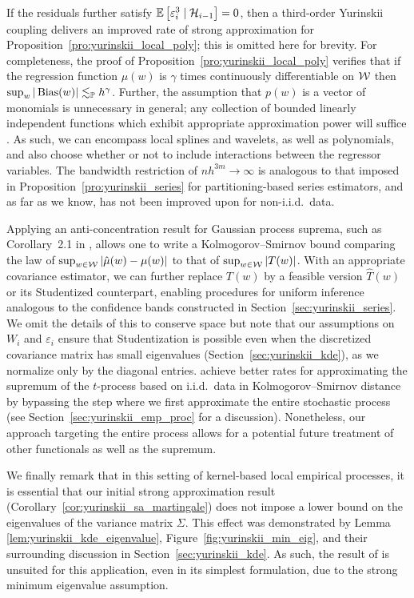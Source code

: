If the residuals further satisfy
$\mathbb{E} \left[ \varepsilon_i^3 \mid \mathcal{H}_{i-1} \right] = 0$, then
a third-order Yurinskii coupling delivers an improved rate of strong
approximation for Proposition~\ref{pro:yurinskii_local_poly}; this is omitted
here for
brevity. For completeness, the proof of
Proposition~\ref{pro:yurinskii_local_poly}
verifies that if the regression function $\mu(w)$ is $\gamma$ times
continuously differentiable on $\mathcal{W}$ then
$\sup_w |\operatorname{Bias}(w)| \lesssim_{\mathbb{P}} h^\gamma$. Further, the assumption that $p(w)$
is a vector of monomials is unnecessary in general; any collection of bounded
linearly independent functions which exhibit appropriate approximation power
will suffice \citep{eggermont2009maximum}. As such, we can encompass local
splines and wavelets, as well as polynomials, and also choose whether or not to
include interactions between the regressor variables. The bandwidth restriction
of $n h^{3m} \to \infty$ is analogous to that imposed in
Proposition~\ref{pro:yurinskii_series} for partitioning-based series
estimators, and as
far as we know, has not been improved upon for non-i.i.d.\ data.

Applying an anti-concentration result for Gaussian process suprema, such as
Corollary~2.1 in \citet{chernozhukov2014anti}, allows one to write a
Kolmogorov--Smirnov bound comparing the law of
$\sup_{w \in \mathcal{W}}|\hat\mu(w) - \mu(w)|$ to that of $\sup_{w \in \mathcal{W}}|T(w)|$.
With an appropriate covariance estimator, we can further replace $T(w)$ by a
feasible version $\hat T(w)$ or its Studentized counterpart, enabling
procedures for uniform inference analogous to the confidence bands constructed
in Section~\ref{sec:yurinskii_series}. We omit the details of this to conserve
space but
note that our assumptions on $W_i$ and $\varepsilon_i$ ensure that
Studentization is possible even when the discretized covariance matrix has
small eigenvalues (Section~\ref{sec:yurinskii_kde}), as we normalize only by
the diagonal
entries. \citet[Remark~3.1]{chernozhukov2014gaussian} achieve better rates for
approximating the supremum of the $t$-process based on i.i.d.\ data in
Kolmogorov--Smirnov distance by bypassing the step where we first approximate
the entire stochastic process (see Section~\ref{sec:yurinskii_emp_proc} for a
discussion).
Nonetheless, our approach targeting the entire process allows for a
potential future
treatment of other functionals as well as the supremum.

We finally remark that in this setting of kernel-based local empirical
processes, it is essential that our initial strong approximation result
(Corollary~\ref{cor:yurinskii_sa_martingale}) does not impose a lower bound on
the
eigenvalues of the variance matrix $\Sigma$. This effect was demonstrated by
Lemma \ref{lem:yurinskii_kde_eigenvalue},
Figure~\ref{fig:yurinskii_min_eig}, and their surrounding discussion in
Section~\ref{sec:yurinskii_kde}. As such, the result of \citet{li2020uniform} is
unsuited for this application, even in its simplest formulation,
due to the strong minimum eigenvalue assumption.

